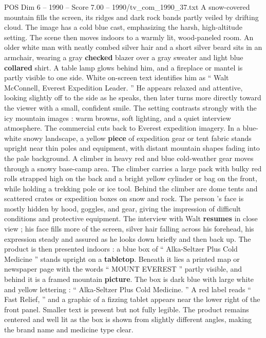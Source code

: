 \begin{textsample}{POS Dim 6 – 1990 – Score 7.00 – 1990/tv\_com\_1990\_37.txt}  \label{ex:f6_pos_075}
A snow-covered mountain fills the screen, its ridges and dark rock bands partly veiled by drifting cloud.
The image has a cold blue cast, emphasizing the harsh, high-altitude setting.
The scene then moves indoors to a warmly lit, wood-paneled room.
An older white man with neatly combed silver hair and a short silver beard sits in an armchair, wearing a gray \textbf{checked} blazer over a gray sweater and light blue \textbf{collared} shirt.
A table lamp glows behind him, and a fireplace or mantel is partly visible to one side.
White on-screen text identifies him as “ Walt McConnell, Everest Expedition Leader. ” He appears relaxed and attentive, looking slightly off to the side as he speaks, then later turns more directly toward the viewer with a small, confident smile.
The setting contrasts strongly with the icy mountain images : warm browns, soft lighting, and a quiet interview atmosphere.
The commercial cuts back to Everest expedition imagery.
In a blue-white snowy landscape, a yellow \textbf{piece} of expedition gear or tent fabric stands upright near thin poles and equipment, with distant mountain shapes fading into the pale background.
A climber in heavy red and blue cold-weather gear moves through a snowy base-camp area.
The climber carries a large pack with bulky red rolls strapped high on the back and a bright yellow cylinder or bag on the front, while holding a trekking pole or ice tool.
Behind the climber are dome tents and scattered crates or expedition boxes on snow and rock.
The person ’s face is mostly hidden by hood, goggles, and gear, giving the impression of difficult conditions and protective equipment.
The interview with Walt \textbf{resumes} in close view ; his face fills more of the screen, silver hair falling across his forehead, his expression steady and assured as he looks down briefly and then back up.
The product is then presented indoors : a blue box of “ Alka-Seltzer Plus Cold Medicine ” stands upright on a \textbf{tabletop}.
Beneath it lies a printed map or newspaper page with the words “ MOUNT EVEREST ” partly visible, and behind it is a framed mountain \textbf{picture}.
The box is dark blue with large white and yellow lettering : “ Alka-Seltzer Plus Cold Medicine. ” A red label reads “ Fast Relief, ” and a graphic of a fizzing tablet appears near the lower right of the front panel.
Smaller text is present but not fully legible.
The product remains centered and well lit as the box is shown from slightly different angles, making the brand name and medicine type clear.

\end{textsample}
